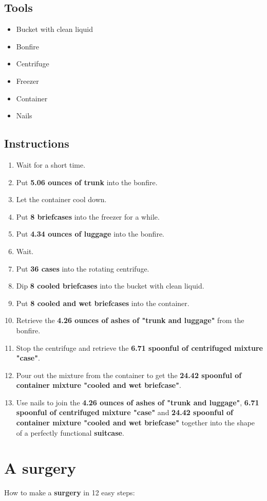 \documentclass{article}
\begin{document}
\subsection{Tools}\begin{itemize}
\item 
Bucket with clean liquid
\item 
Bonfire
\item 
Centrifuge
\item 
Freezer
\item 
Container
\item 
Nails
\end{itemize}
\subsection{Instructions}\begin{enumerate}
\item 
Wait for a short time.
\item 
Put \textbf{5.06 ounces of trunk} into the bonfire.
\item 
Let the container cool down.
\item 
Put \textbf{8 briefcases} into the freezer for a while.
\item 
Put \textbf{4.34 ounces of luggage} into the bonfire.
\item 
Wait.
\item 
Put \textbf{36 cases} into the rotating centrifuge.
\item 
Dip \textbf{8 cooled briefcases} into the bucket with clean liquid.
\item 
Put \textbf{8 cooled and wet briefcases} into the container.
\item 
Retrieve the \textbf{4.26 ounces of ashes of "trunk and luggage"} from the bonfire.
\item 
Stop the centrifuge and retrieve the \textbf{6.71 spoonful of centrifuged mixture "case"}.
\item 
Pour out the mixture from the container to get the \textbf{24.42 spoonful of container mixture "cooled and wet briefcase"}.
\item 
Use nails to join the \textbf{4.26 ounces of ashes of "trunk and luggage"}, \textbf{6.71 spoonful of centrifuged mixture "case"} and \textbf{24.42 spoonful of container mixture "cooled and wet briefcase"} together into the shape of a perfectly functional \textbf{suitcase}.
\end{enumerate}
\newpage
\section{A surgery}How to make a \textbf{surgery} in 12 easy steps:
\end{document}
